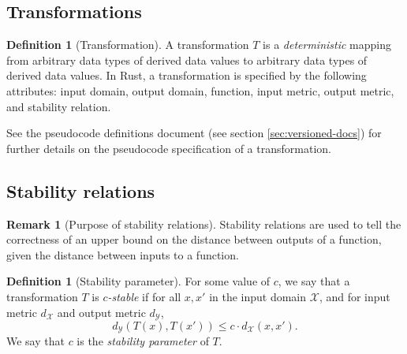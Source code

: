 \documentclass[11pt,a4paper]{article}
\theoremstyle{definition}
\newtheorem{remark}[theorem]{Remark}
\newtheorem{definition}[theorem]{Definition}
\newcommand{\X}{\mathcal{X}}
\newcommand{\Y}{\mathcal{Y}}
\newcommand{\silvia}[1]{{ {\color{blue}{(silvia)~#1}}}}
\begin{document}
\subsection{Transformations}

\begin{definition}[Transformation]
    A transformation $T$ is a \textit{deterministic} mapping from arbitrary data types of derived data values to arbitrary data types of derived data values. In Rust, a transformation is specified by the following attributes: input domain, output domain, function, input metric, output metric, and stability relation. 
\end{definition}

See the pseudocode definitions document (see section \ref{sec:versioned-docs}) for further details on the pseudocode specification of a transformation.

\subsection{Stability relations}

\begin{remark}[Purpose of stability relations]
    Stability relations are used to tell the correctness of an upper bound on the distance between outputs of a function, given the distance between inputs to a function.
\end{remark}

\begin{definition}[Stability parameter]\label{def:c}
    For some value of $c$, we say that a transformation $T$ is $c$\textit{-stable} if for all $x, x'$ in the input domain $\X$, and for input metric $d_{\X}$ and output metric $d_{\Y}$,
    \begin{equation}
        d_{\mathcal{Y}}(T(x), T(x')) \leq c \cdot d_{\mathcal{X}}(x, x').
    \end{equation}
    We say that $c$ is the \textit{stability parameter} of $T$. 
\end{definition}
\end{document}
